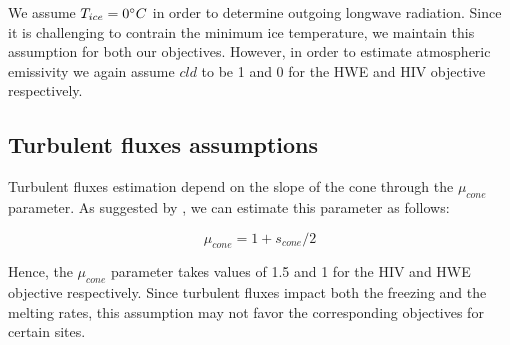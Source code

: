 \documentclass[tc, manuscript]{copernicus}
\begin{document}
We assume $T_{ice} = 0 ^{\circ} C$ in order to determine outgoing longwave radiation. Since it is challenging to
contrain the minimum ice temperature, we maintain this assumption for both our objectives. However, in order to
estimate atmospheric emissivity we again assume $cld$ to be 1 and 0 for the HWE and HIV objective respectively.

\subsection{Turbulent fluxes assumptions} \label{sec:Qs}

Turbulent fluxes estimation depend on the slope of the cone through the $\mu_{cone}$ parameter. As suggested 
by \citet{oerlemansBriefCommunicationGrowth2021}, we can estimate this parameter as follows:

\begin{equation}
  \mu_{cone} =1 + s_{cone}/2
\end{equation}

Hence, the $\mu_{cone}$ parameter takes values of 1.5 and 1 for the HIV and HWE objective respectively.  Since
turbulent fluxes impact both the freezing and the melting rates, this assumption may not favor the corresponding
objectives for certain sites.

\noappendix 



\end{document}
